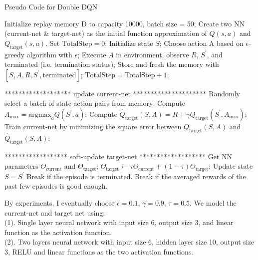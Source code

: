 \documentclass[11pt]{article}
\begin{document}
\begin{algorithm}[H]
\caption{Pseudo Code for Double DQN}
\begin{algorithmic} [1]
\STATE Initialize replay memory D to capacity 10000, batch size = 50; 
\STATE Create two NN (current-net \& target-net) as the initial function approximation of $Q(s, a)$ and $Q_{\mathrm{target}}(s, a)$.
\STATE Set $\mathrm{TotalStep} = 0$;
    \STATE Initialize state $S$;
    \STATE Choose action A based on $\epsilon$-greedy algorithm with $\epsilon$;
    \STATE Execute $A$ in environment, observe $R$, $S^{'}$, and $\mathrm{terminated}$ (i.e. termination status);
    \STATE Store and fresh the memory with $[S, A, R, S^{'}, \mathrm{terminated}]$;
    \STATE $\mathrm{TotalStep} = \mathrm{TotalStep}+1$;
    
    ******************* update current-net *********************
    \STATE Randomly select a batch of state-action pairs from memory;
      \STATE Compute $A_{\max} = \mathrm{argmax}_a Q(S^{'}, a)$;
      \STATE Compute $\hat{Q}_{\mathrm{target}}(S, A) = R + \gamma Q_{\mathrm{target}}(S^{'}, A_{\max})$;
      \STATE Train current-net by minimizing the square error between $Q_{\mathrm{target}}(S,A)$ and $\hat{Q}_{\mathrm{target}}(S,A)$;
    \ENDFOR
    \ENDIF
    
    ****************** soft-update target-net *******************
    \STATE Get NN parameters $\Theta_{\mathrm{current}}$ and $\Theta_{\mathrm{target}}$;
    \STATE $\Theta_{\mathrm{target}} \leftarrow \tau \Theta_{\mathrm{current}} + (1 - \tau) \Theta_{\mathrm{target}}$;
    \ENDIF
    \STATE Update state $S = S^{'}$
    \STATE Break if the episode is terminated.
    \ENDFOR
    \STATE Break if the averaged rewards of the past few episodes is good enough.
\ENDFOR


\end{algorithmic}
\end{algorithm}



By experiments, I eventually choose $\epsilon = 0.1$, $\gamma = 0.9$, $\tau = 0.5$. We model the current-net and target net using:  \\
(1). Single layer neural network with input size 6, output size 3, and linear function as the activation function.  \\
(2). Two layers neural network with input size 6, hidden layer size 10, output size 3, RELU and linear functions as the two activation functions. 
\end{document}
